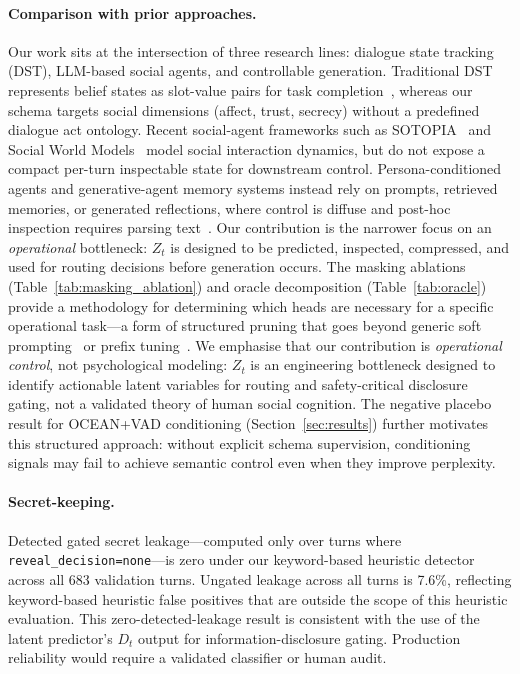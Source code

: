 \documentclass[11pt]{article}
\begin{document}
\paragraph{Comparison with prior approaches.}
Our work sits at the intersection of three research lines: dialogue state tracking (DST), LLM-based social agents, and controllable generation. Traditional DST represents belief states as slot-value pairs for task completion~\cite{mrksic2017neural}, whereas our schema targets social dimensions (affect, trust, secrecy) without a predefined dialogue act ontology. Recent social-agent frameworks such as SOTOPIA~\cite{zhou2024sotopia} and Social World Models~\cite{zhou2025social} model social interaction dynamics, but do not expose a compact per-turn inspectable state for downstream control. Persona-conditioned agents and generative-agent memory systems instead rely on prompts, retrieved memories, or generated reflections, where control is diffuse and post-hoc inspection requires parsing text~\cite{park2023generative,shao2023character}.
Our contribution is the narrower focus on an \textit{operational} bottleneck: $Z_t$ is designed to be predicted, inspected, compressed, and used for routing decisions before generation occurs. The masking ablations (Table~\ref{tab:masking_ablation}) and oracle decomposition (Table~\ref{tab:oracle}) provide a methodology for determining which heads are necessary for a specific operational task---a form of structured pruning that goes beyond generic soft prompting~\cite{lester2021power} or prefix tuning~\cite{li2021prefix}. We emphasise that our contribution is \textit{operational control}, not psychological modeling: $Z_t$ is an engineering bottleneck designed to identify actionable latent variables for routing and safety-critical disclosure gating, not a validated theory of human social cognition. The negative placebo result for OCEAN+VAD conditioning (Section~\ref{sec:results}) further motivates this structured approach: without explicit schema supervision, conditioning signals may fail to achieve semantic control even when they improve perplexity.

\paragraph{Secret-keeping.}
Detected gated secret leakage---computed only over turns where \texttt{reveal\_decision=none}---is zero under our keyword-based heuristic detector across all 683 validation turns.
Ungated leakage across all turns is 7.6\%, reflecting keyword-based heuristic false positives that are outside the scope of this heuristic evaluation.
This zero-detected-leakage result is consistent with the use of the latent predictor's $D_t$ output for information-disclosure gating. Production reliability would require a validated classifier or human audit.
\end{document}

